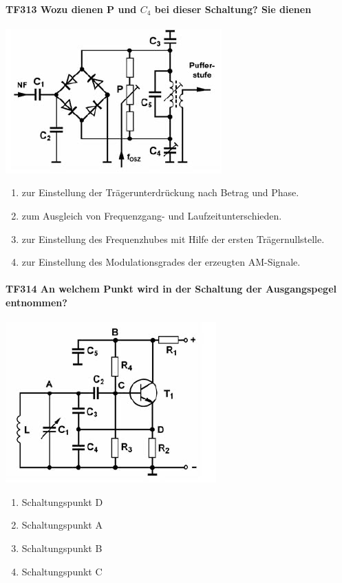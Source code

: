 \documentclass[8pt]{article}
\begin{document}
\paragraph*{TF313 Wozu dienen P und $C_{4}$ bei dieser Schaltung? Sie dienen}
\begin{center}
	\begin{minipage}{\linewidth}
		\centering
		\includegraphics[scale=1.0]{pics/tf313_a.jpg}
	\end{minipage}
\end{center}
\begin{enumerate}[nolistsep,label=\Alph*]
\item zur Einstellung der Trägerunterdrückung nach Betrag und Phase.
\item zum Ausgleich von Frequenzgang- und Laufzeitunterschieden.
\item zur Einstellung des Frequenzhubes mit Hilfe der ersten Trägernullstelle.
\item zur Einstellung des Modulationsgrades der erzeugten AM-Signale.
\end{enumerate}

\paragraph*{TF314 An welchem Punkt wird in der Schaltung der Ausgangspegel entnommen?}
\begin{center}
	\begin{minipage}{\linewidth}
		\centering
		\includegraphics[scale=1.0]{pics/tf314_a.jpg}
	\end{minipage}
\end{center}
\begin{enumerate}[nolistsep,label=\Alph*]
\item Schaltungspunkt D
\item Schaltungspunkt A
\item Schaltungspunkt B
\item Schaltungspunkt C
\end{enumerate}
\end{document}

